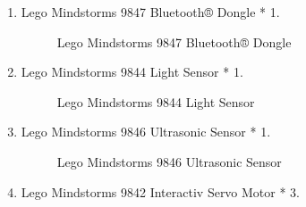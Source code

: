 \documentclass[11pt, a4paper]{report}
\begin{document}
\begin{enumerate}
	\item  Lego Mindstorms 9847 Bluetooth® Dongle * 1. 
		\begin{figure}[ht]
		\centering
		\setlength\fboxsep{2pt}
		\setlength\fboxrule{0.2pt}
		\caption{Lego Mindstorms 9847 Bluetooth® Dongle}
		\label{sec:bd}
		\label{fig:bd}
		\end{figure}
	\item  Lego Mindstorms 9844 Light Sensor * 1.\begin{figure}[ht]
		\centering
		\setlength\fboxsep{2pt}
		\setlength\fboxrule{0.2pt}
		\caption{Lego Mindstorms 9844 Light Sensor}
		\label{sec:ls}
		\label{fig:ls}
		\end{figure}
	\item  Lego Mindstorms 9846 Ultrasonic Sensor * 1.
		\begin{figure}[ht]
		\centering
		\setlength\fboxsep{2pt}
		\setlength\fboxrule{0.2pt}
		\caption{Lego Mindstorms 9846 Ultrasonic Sensor}
		\label{sec:us}
		\label{fig:us}
		\end{figure}
		\pagebreak
	\item  Lego Mindstorms 9842 Interactiv Servo Motor * 3.
		\begin{figure}[ht]
		\centering
		\setlength\fboxsep{2pt}
		\setlength\fboxrule{0.2pt}

\end{figure}
\end{enumerate}
\end{document}
